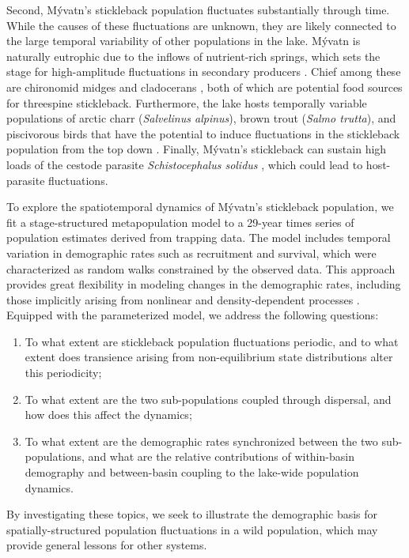 Second, M\'{y}vatn's stickleback population fluctuates substantially through time.
While the causes of these fluctuations are unknown, 
they are likely connected to the large temporal variability 
of other populations in the lake.
M\'{y}vatn is naturally eutrophic due to the inflows of nutrient-rich springs,
which sets the stage for high-amplitude fluctuations in secondary producers
\citep{einarsson2004myvatn}.
Chief among these are chironomid midges and cladocerans
\citep{einarsson2002, einarsson2004clad, gardarsson2004population, ives2008},
both of which are potential food sources for threespine stickleback.
Furthermore, the lake hosts temporally variable populations 
of arctic charr (\emph{Salvelinus alpinus}), 
brown trout (\emph{Salmo trutta}), 
and piscivorous birds that have the potential 
to induce fluctuations in the stickleback population from the top down
\citep{einarsson2004moulting, gudbergsson2004}.
Finally, M\'{y}vatn's stickleback can sustain high loads of the cestode parasite
\emph{Schistocephalus solidus} \citep{gislason1998, karvonen2013},
which could lead to host-parasite fluctuations.

To explore the spatiotemporal dynamics of M\'{y}vatn's stickleback population, 
we fit a stage-structured metapopulation model \citep{caswell2001matrix}
to a 29-year times series of population estimates derived from trapping data.
The model includes temporal variation in demographic rates such as recruitment and survival,
which were characterized as random walks constrained by the observed data.
This approach provides great flexibility in modeling changes in the demographic rates,
including those implicitly arising from nonlinear and density-dependent processes
\citep{zeng1998, ives2012}.
Equipped with the parameterized model, we address the following questions:
%
\begin{enumerate}[label=(\alph*)]
\item
To what extent are stickleback population fluctuations periodic, 
and to what extent does transience arising from non-equilibrium state distributions
alter this periodicity;
%
\item
To what extent are the two sub-populations coupled through dispersal,
and how does this affect the dynamics; 
%
\item
To what extent are the demographic rates synchronized between the two sub-populations,
and what are the relative contributions of within-basin demography 
and between-basin coupling to the lake-wide population dynamics.
\end{enumerate}
%
By investigating these topics, 
we seek to illustrate the demographic basis for spatially-structured population fluctuations
in a wild population, 
which may provide general lessons for other systems. 
